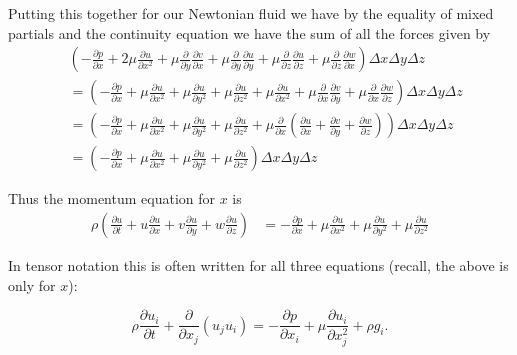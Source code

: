 Putting this together for our Newtonian fluid we have by the equality of mixed partials and the continuity equation we have the sum of all the forces given by
\begin{align*} & \left (-\frac{\partial p}{\partial x} + 2 \mu \frac{\partial u}{\partial x^2} + \mu \frac{\partial}{\partial y} \frac{\partial v}{\partial x} + \mu \frac{\partial }{\partial y} \frac{\partial u}{\partial y} + \mu \frac{\partial }{\partial z} \frac{\partial u}{\partial z} + \mu \frac{\partial }{\partial z} \frac{\partial w}{\partial x}\right ) \Delta x \Delta y \Delta z\\
& = \left ( -\frac{\partial p}{\partial x} + \mu \frac{\partial u}{\partial x^2} + \mu\frac{\partial u}{\partial y^2} + \mu \frac{\partial u}{\partial z^2}  + \mu \frac{\partial u}{\partial x^2} + \mu \frac{\partial}{\partial x} \frac{\partial v}{\partial y} + \mu \frac{\partial }{\partial x} \frac{\partial w}{\partial z} \right ) \Delta x \Delta y \Delta z\\
& = \left (-\frac{\partial p}{\partial x} + \mu \frac{\partial u}{\partial x^2} + \mu\frac{\partial u}{\partial y^2} + \mu \frac{\partial u}{\partial z^2}  + \mu \frac{\partial }{\partial x}\left ( \frac{\partial u}{\partial x} + \frac{\partial v}{\partial y} + \frac{\partial w}{\partial z} \right ) \right ) \Delta x \Delta y \Delta z\\
& = \left ( -\frac{\partial p}{\partial x} + \mu \frac{\partial u}{\partial x^2} + \mu\frac{\partial u}{\partial y^2} + \mu \frac{\partial u}{\partial z^2}\right ) \Delta x \Delta y \Delta z\end{align*}

Thus the momentum equation for $x$ is
\begin{align}  \rho \left ( \frac{\partial u }{\partial t} + u \frac{\partial u }{\partial x} + v \frac{\partial u}{\partial y} + w \frac{\partial u}{\partial z} \right ) &= -\frac{\partial p}{\partial x} + \mu \frac{\partial u}{\partial x^2} + \mu\frac{\partial u}{\partial y^2} + \mu \frac{\partial u}{\partial z^2}\end{align}

In tensor notation this is often written for all three equations (recall, the above is only for $x$):

\begin{equation} \rho \frac{\partial u_i}{\partial t} + \frac{\partial}{\partial x_j} \left( u_j u_i \right) = -\frac{\partial p}{\partial x_i}  + \mu \frac{\partial u_i}{\partial x_j^2}  + \rho g_i . \end{equation}

